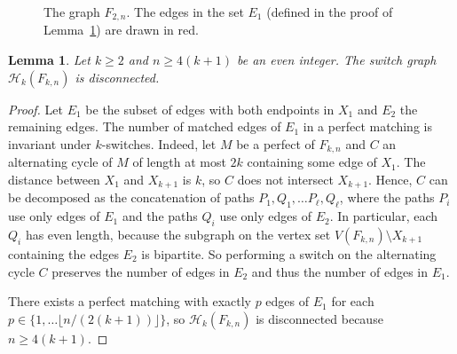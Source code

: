 \documentclass[11pt,a4paper]{article}
\newtheorem{lemma}[theorem]{Lemma}
\theoremstyle{definition}
\begin{document}
\begin{figure}[ht!]
  \centering        
  \caption{The graph $F_{2,n}$. The edges in the set $E_1$ (defined in the proof of Lemma~\ref{lem:non_connected_precise}) are drawn in red.}\label{fig:non_connected_precise}
\end{figure}
\begin{lemma}\label{lem:non_connected_precise}
  Let $k \ge 2$ and $n \ge 4(k+1)$ be an even integer. The switch graph $\mathcal H_{k}(F_{k,n})$ is
  disconnected.
\end{lemma}
\begin{proof}
  Let $E_1$ be the subset of edges with both endpoints in $X_1$ and $E_2$ the
  remaining edges. The number of matched edges of $E_1$ in a
  perfect matching is invariant under $k$-switches. Indeed, let $M$ be a perfect
  of $F_{k,n}$ and $C$ an alternating cycle of $M$ of length at most $2k$
  containing some edge of $X_1$. The distance between $X_1$ and $X_{k+1}$ is
  $k$, so $C$ does not intersect $X_{k+1}$. Hence, $C$ can be decomposed as the
  concatenation of paths $P_1,Q_1, \dots P_\ell, Q_\ell$, where the paths $P_i$
  use only edges of $E_1$ and the paths $Q_i$ use only edges of $E_2$. In
  particular, each $Q_i$ has even length, because the subgraph on the vertex set
  $V(F_{k,n}) \setminus X_{k+1}$ containing the edges $E_2$ is bipartite. So
  performing a switch on the alternating cycle $C$ preserves the number of edges
  in $E_2$ and thus the number of edges in $E_1$.

  There exists a perfect matching with exactly $p$ edges
  of $E_1$ for each $p \in \{1, \dots \lfloor n/(2(k+1)) \rfloor\}$, so
  $\mathcal H_{k}(F_{k,n})$ is disconnected because $n \ge 4(k+1)$.
\end{proof}
\end{document}
